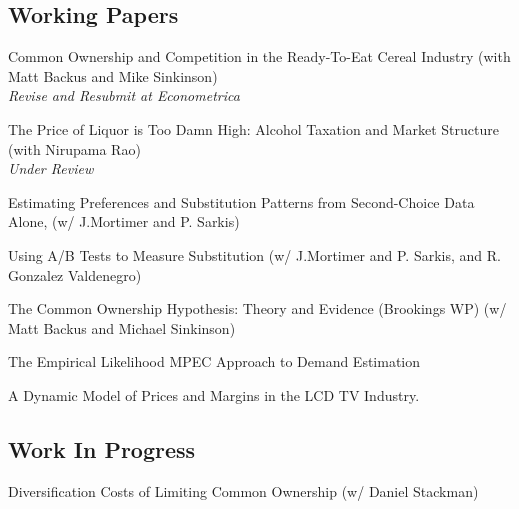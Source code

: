 \documentclass[letterpaper]{article}
\renewenvironment{itemize}{
  \begin{list}{}{
    \setlength{\leftmargin}{1.5em}
  }
}{
  \end{list}
}
\begin{document}
\subsection*{Working Papers}
\begin{itemize}
\item Common Ownership and Competition in the Ready-To-Eat Cereal Industry (with Matt Backus and Mike Sinkinson)  \\\textit{Revise and Resubmit at Econometrica} 
\item The Price of Liquor is Too Damn High: Alcohol Taxation and Market Structure (with Nirupama Rao)  \\\textit{Under Review} 
\item Estimating Preferences and Substitution Patterns from Second-Choice Data Alone, (w/ J.Mortimer and P. Sarkis) 
\item Using A/B Tests to Measure Substitution (w/ J.Mortimer and P. Sarkis, and R. Gonzalez Valdenegro) 
\item The Common Ownership Hypothesis: Theory and Evidence (Brookings WP) (w/ Matt Backus and Michael Sinkinson) 
\item The Empirical Likelihood MPEC Approach to Demand Estimation\\ %
\item A Dynamic Model of Prices and Margins in the LCD TV Industry. 
\end{itemize}

\subsection*{Work In Progress}
\begin{itemize}
\item Diversification Costs of Limiting Common Ownership (w/ Daniel Stackman)
\end{itemize}
\end{document}
